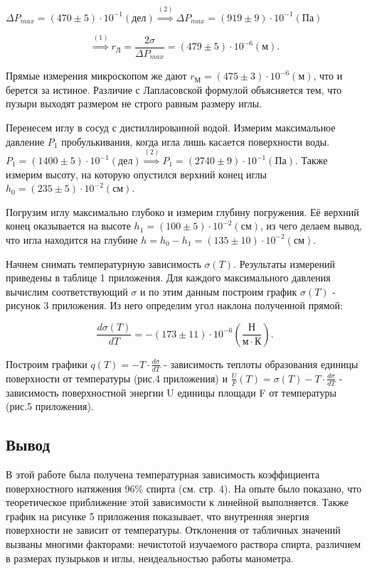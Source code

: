\documentclass[a4paper, fontsize = 14pt]{article}
\begin{document}
$ \Delta P_{max} = (470 \pm 5)\cdot10^{-1} (дел) \overset{(2)}{\Longrightarrow }\Delta P_{max} = (919\pm9)\cdot10^{-1}(Па)$

\[ \overset{(1)}{\Longrightarrow} r_{Л} = \frac{2 \sigma }{\Delta P_{max}} = (479\pm5)\cdot10^{-6}(м). \]

Прямые измерения микроскопом же дают $r_{М} = (475\pm3)\cdot10^{-6}(м)$, что и берется за истиное. Различие с Лапласовской формулой объясняется тем, что пузыри выходят размером не строго равным размеру иглы. 

Перенесем иглу в сосуд с дистиллированной водой. Измерим максимальное давление $P_1$ пробулькивания, когда игла лишь касается поверхности воды. $P_1 = (1400\pm5)\cdot10^{-1}(дел)\overset{(2)}{\Longrightarrow}P_1 = (2740\pm9)\cdot10^{-1}(Па)$. Также измерим высоту, на которую опустился верхний конец иглы $h_0 = (235\pm5)\cdot10^{-2}(см)$.

Погрузим иглу максимально глубоко и измерим глубину погружения. Её верхний конец оказывается на высоте $h_1 = (100\pm5)\cdot10^{-2}(см)$, из чего делаем вывод, что игла находится на глубине $h = h_0 - h_1 = (135\pm10)\cdot10^{-2}(см)$. 

Начнем снимать температурную зависимость $\sigma(T)$. Результаты измерений приведены в таблице 1 приложения. Для каждого максимального давления вычислим соответствующий $\sigma$ и по этим данным построим график $\sigma(T)$ - рисунок 3 приложения. Из него определим угол наклона полученной прямой:

\[ \frac{d\sigma(T)}{dT} = -(173\pm11)\cdot10^{-6} (\frac{Н}{м\cdot К}). \]

Построим графики $q(T)=-T\cdot\frac{d\sigma}{dT}$ - зависимость теплоты образования единицы поверхности от температуры (рис.4 приложения) и $\frac{U}{F}(T) = \sigma(T) - T\cdot\frac{d\sigma}{dT}$ - зависимость поверхностной энергии U единицы площади F от температуры (рис.5 приложения).

\subsection*{Вывод}

В этой работе была получена температурная зависимость коэффициента поверхностного натяжения $96\%$ спирта (см. стр. 4). На опыте было показано, что теоретическое приближение этой зависимости к линейной выполняется. Также график на рисунке 5 приложения показывает, что внутренняя энергия поверхности не зависит от температуры. Отклонения от табличных значений вызваны многими факторами: нечистотой изучаемого раствора спирта, различием в размерах пузырьков и иглы, неидеальностью работы манометра.
\end{document}
